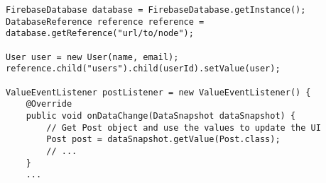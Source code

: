 \begin{breakbox}
\begin{lstlisting}
FirebaseDatabase database = FirebaseDatabase.getInstance();
DatabaseReference reference reference = database.getReference("url/to/node");

User user = new User(name, email);
reference.child("users").child(userId).setValue(user);

ValueEventListener postListener = new ValueEventListener() {
    @Override
    public void onDataChange(DataSnapshot dataSnapshot) {
        // Get Post object and use the values to update the UI
        Post post = dataSnapshot.getValue(Post.class);
        // ...
    }
    ...
\end{lstlisting}
\end{breakbox}

